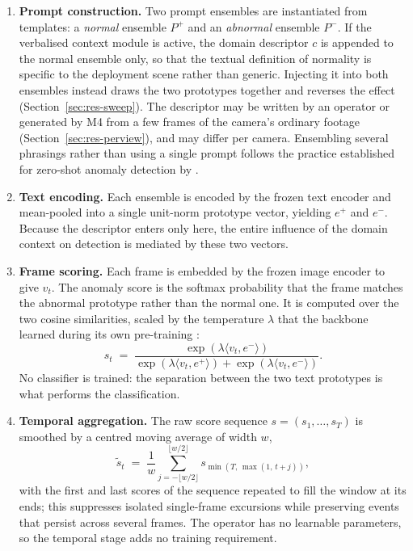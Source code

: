 \documentclass[a4paper,fleqn]{cas-sc}
\begin{document}
\begin{enumerate}[{Stage}~1.]
  \item \textbf{Prompt construction.} Two prompt ensembles are instantiated from
        templates: a \emph{normal} ensemble $P^{+}$ and an \emph{abnormal}
        ensemble $P^{-}$. If the verbalised context module is active, the domain
        descriptor $c$ is appended to the normal ensemble only, so that the
        textual definition of normality is specific to the deployment scene
        rather than generic. Injecting it into both ensembles instead draws the
        two prototypes together and reverses the effect
        (Section~\ref{sec:res-sweep}). The descriptor may be written by an
        operator or generated by M4 from a few frames of the camera's ordinary
        footage (Section~\ref{sec:res-perview}), and may differ per camera.
        Ensembling several phrasings rather than using a single prompt
        follows the practice established for zero-shot anomaly detection by
        \citet{jeong2023winclip}.

  \item \textbf{Text encoding.} Each ensemble is encoded by the frozen text
        encoder and mean-pooled into a single unit-norm prototype vector,
        yielding $e^{+}$ and $e^{-}$. Because the descriptor enters only here,
        the entire influence of the domain context on detection is mediated by
        these two vectors.

  \item \textbf{Frame scoring.} Each frame is embedded by the frozen image
        encoder to give $v_t$. The anomaly score is the softmax probability that
        the frame matches the abnormal prototype rather than the normal one. It
        is computed over the two cosine similarities, scaled by the temperature
        $\lambda$ that the backbone learned during its own pre-training
        \citep{radford2021clip}:
        \begin{equation}
        s_t \;=\; \frac{\exp\!\left(\lambda \langle v_t, e^{-}\rangle\right)}
                       {\exp\!\left(\lambda \langle v_t, e^{+}\rangle\right)
                       +\exp\!\left(\lambda \langle v_t, e^{-}\rangle\right)}.
        \label{eq:framescore}
        \end{equation}
        No classifier is trained: the separation between the two text
        prototypes is what performs the classification.

  \item \textbf{Temporal aggregation.} The raw score sequence
        $s = (s_1,\dots,s_T)$ is smoothed by a centred moving average of width
        $w$,
        \begin{equation}
        \tilde{s}_t \;=\; \frac{1}{w}\sum_{j=-\lfloor w/2\rfloor}^{\lfloor w/2\rfloor}
                          s_{\min(T,\,\max(1,\,t+j))},
        \label{eq:smooth}
        \end{equation}
        with the first and last scores of the sequence repeated to fill the window at
        its ends; this suppresses isolated single-frame excursions while preserving
        events that persist across several frames. The operator has no learnable
        parameters, so the temporal stage adds no training requirement.


\end{enumerate}
\end{document}
